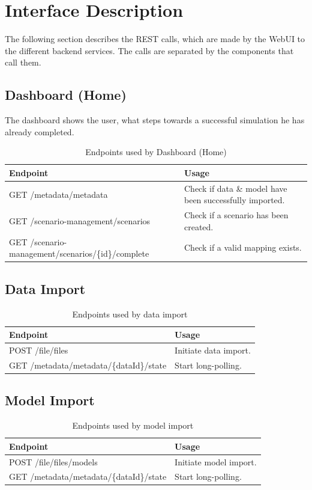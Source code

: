 \section{Interface Description}
The following section describes the REST calls, which are made by the WebUI to the different backend services. The calls are separated by the components that call them.


\subsection{Dashboard (Home)}
The dashboard shows the user, what steps towards a successful simulation he has already completed.
\begin{table}[H]
	\caption{Endpoints used by Dashboard (Home)}
	\begin{tabularx}{\textwidth}{|l|X|}
		\hline
		\textbf{Endpoint} & \textbf{Usage} \\ \hline
		GET /metadata/metadata & Check if data \& model have been successfully imported. \\ \hline
		GET /scenario-management/scenarios & Check if a scenario has been created.\\ \hline
		GET /scenario-management/scenarios/\{id\}/complete & Check if a valid mapping exists.\\ \hline
	\end{tabularx}
\end{table}


\subsection{Data Import}
\begin{table}[H]
	\caption{Endpoints used by data import}
	\begin{tabularx}{\textwidth}{|l|X|}
		\hline
		\textbf{Endpoint} & \textbf{Usage} \\ \hline
		POST /file/files & Initiate data import.\\ \hline
		GET /metadata/metadata/\{dataId\}/state & Start long-polling. \\ \hline
	\end{tabularx}
\end{table}


\subsection{Model Import}
\begin{table}[H]
	\caption{Endpoints used by model import}
	\begin{tabularx}{\textwidth}{|l|X|}
		\hline
		\textbf{Endpoint} & \textbf{Usage} \\ \hline
		POST /file/files/models & Initiate model import. \\ \hline
		GET /metadata/metadata/\{dataId\}/state & Start long-polling. \\ \hline
	\end{tabularx}
\end{table}


